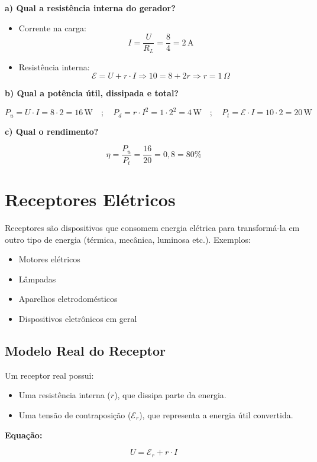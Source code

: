 \textbf{a) Qual a resistência interna do gerador?}

\begin{itemize}
    \item Corrente na carga:
    \[
    I = \frac{U}{R_L} = \frac{8}{4} = 2\,\text{A}
    \]
    \item Resistência interna:
    \[
    \mathcal{E} = U + r \cdot I \Rightarrow 10 = 8 + 2r \Rightarrow r = 1\,\Omega
    \]
\end{itemize}

\textbf{b) Qual a potência útil, dissipada e total?}

\[
P_u = U \cdot I = 8 \cdot 2 = 16\,\text{W}
\quad ; \quad
P_d = r \cdot I^2 = 1 \cdot 2^2 = 4\,\text{W}
\quad ; \quad
P_t = \mathcal{E} \cdot I = 10 \cdot 2 = 20\,\text{W}
\]

\textbf{c) Qual o rendimento?}

\[
\eta = \frac{P_u}{P_t} = \frac{16}{20} = 0{,}8 = 80\%
\]

\section{Receptores Elétricos}
Receptores são dispositivos que consomem energia elétrica para transformá-la em outro tipo de energia (térmica, mecânica, luminosa etc.). Exemplos:

\begin{itemize}
    \item Motores elétricos
    \item Lâmpadas
    \item Aparelhos eletrodomésticos
    \item Dispositivos eletrônicos em geral
\end{itemize}

\subsection{Modelo Real do Receptor}
Um receptor real possui:
\begin{itemize}
    \item Uma resistência interna ($r$), que dissipa parte da energia.
    \item Uma tensão de contraposição ($\mathcal{E}_r$), que representa a energia útil convertida.
\end{itemize}

\textbf{Equação:}

\[
U = \mathcal{E}_r + r \cdot I
\]

